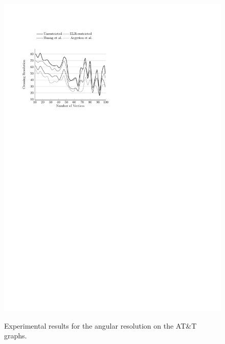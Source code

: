 \documentclass{comjnl}
\begin{document}
\begin{figure}[t!]
{	\includegraphics[scale=0.99,page=12]{figures/north}}
	\caption{Experimental results for the angular resolution on the AT\&T graphs.}
	\label{fig:northAngular}
\end{figure}


\end{document}
